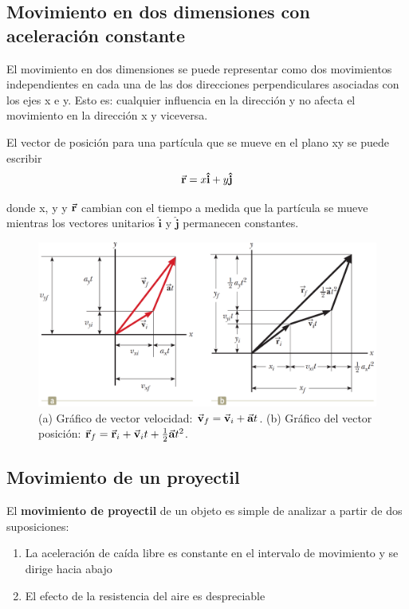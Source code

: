   \subsection{Movimiento en dos dimensiones con aceleración constante}
    \PN El movimiento en dos dimensiones se puede representar como dos movimientos independientes en cada una de las
    dos direcciones perpendiculares asociadas con los ejes x e y. Esto es: cualquier influencia en la dirección y no
    afecta el movimiento en la dirección x y viceversa.

    \PN El vector de posición para una partícula que se mueve en el plano xy se puede escribir
    \begin{equation*}
      \vec{\mathbf{r}} = x \mathbf{\hat{i}} + y \mathbf{\hat{j}}
    \end{equation*}

    \PN donde x, y y $\vec{\mathbf{r}}$ cambian con el tiempo a medida que la partícula se mueve mientras los vectores unitarios
    $\mathbf{\hat{i}}$ y $\mathbf{\hat{j}}$ permanecen constantes.

    \begin{figure}[H]
      \centering
      \includegraphics[scale=0.4]{1/graphics_4/figure_1}
      \caption{(a) Gráfico de vector velocidad: $\vec{\mathbf{v}}_{f} = \vec{\mathbf{v}}_{i} + \vec{\mathbf{a}} t$. (b) Gráfico del vector posición:
      $\vec{\mathbf{r}}_{f} = \vec{\mathbf{r}}_{i} + \vec{\mathbf{v}}_{i} t + \frac{1}{2} \vec{\mathbf{a}} t^{2}$.}
    \end{figure}

  \subsection{Movimiento de un proyectil}
    \PN El \textbf{movimiento de proyectil} de un objeto es simple de analizar a partir de dos suposiciones:
    \begin{enumerate}
      \item La aceleración de caída libre es constante en el intervalo de movimiento y se dirige hacia abajo
      \item El efecto de la resistencia del aire es despreciable
    \end{enumerate}

